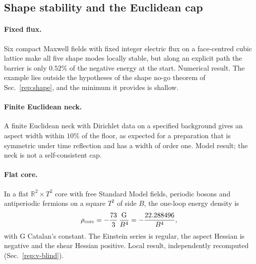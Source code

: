 \subsection{Shape stability and the Euclidean cap}\label{sec:v21-cap}

\paragraph{Fixed flux.}
Six compact Maxwell fields with fixed integer electric flux on a face-centred cubic lattice make all five shape modes locally stable, but along an explicit path the barrier is only $0.52\%$ of the negative energy at the start. %
Numerical result.
The example lies outside the hypotheses of the shape no-go theorem of Sec.~\ref{rep:shape}, and the minimum it provides is shallow.

\paragraph{Finite Euclidean neck.}
A finite Euclidean neck with Dirichlet data on a specified background gives an aspect width within $10\%$ of the floor, as expected for a preparation that is symmetric under time reflection and has a width of order one. %
Model result; the neck is not a self-consistent cap.

\paragraph{Flat core.}
In a flat $\mathbb R^2\times T^2$ core with free Standard Model fields, periodic bosons and antiperiodic fermions on a square $T^2$ of side $B$, the one-loop energy density is
\begin{equation}
\rho_{\rm core}=-\frac{73}{3}\,\frac{\mathrm G}{B^4}=-\frac{22.288496}{B^4},
\label{eq:v21-core}
\end{equation}
with $\mathrm G$ Catalan's constant. %
The Einstein series is regular, the aspect Hessian is negative and the shear Hessian positive.
Local result, independently recomputed (Sec.~\ref{rep:v-blind}).

